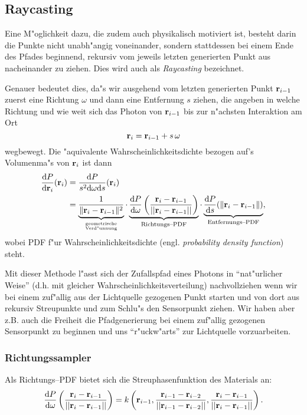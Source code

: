 	\subsection{Raycasting}
	Eine M"oglichkeit dazu, die zudem auch physikalisch motiviert ist, besteht darin die Punkte nicht unabh"angig voneinander, sondern stattdessen bei einem Ende des Pfades beginnend, rekursiv vom jeweils letzten generierten Punkt aus nacheinander zu ziehen. Dies wird auch als {\em Raycasting} bezeichnet.
	
	Genauer bedeutet dies, da"s wir ausgehend vom letzten generierten Punkt $\mathbf{r}_{i-1}$ zuerst eine Richtung $\omega$ und dann eine Entfernung $s$ ziehen, die angeben in welche Richtung und wie weit sich das Photon von $\mathbf{r}_{i-1}$ bis zur n"achsten Interaktion am Ort
	$$\mathbf{r}_i=\mathbf{r}_{i-1}+s\,\omega$$
	wegbewegt.
	Die "aquivalente Wahrscheinlichkeitsdichte bezogen auf's Volumenma"s von $\mathbf{r}_i$ ist dann
	\begin{align*}
		\frac{\text{d}P}{\text{d}\mathbf{r}_i}(\mathbf{r}_i) &= \frac{\text{d}P}{s^2 \text{d}\omega\text{d}s}(\mathbf{r}_i) \\
		&= \underbrace{\frac{1}{\|\mathbf{r}_i - \mathbf{r}_{i-1}\|^2}}_{\text{geometrische}\atop\text{Verd"unnung}} \cdot\underbrace{\frac{\text{d}P}{\text{d}\omega}\left(\frac{\mathbf{r}_i - \mathbf{r}_{i-1}}{||\mathbf{r}_i - \mathbf{r}_{i-1}||}\right)}_{\text{Richtungs--PDF}} \cdot \underbrace{\frac{\text{d}P}{\text{d}s}(\|\mathbf{r}_i-\mathbf{r}_{i-1}\|)}_{\text{Entfernungs--PDF}},
	\end{align*}
	wobei PDF f"ur Wahrscheinlichkeitsdichte (engl. {\em probability density function}) steht.
	
	Mit dieser Methode l"asst sich der Zufallspfad eines Photons in ``nat"urlicher Weise'' (d.h. mit gleicher Wahrscheinlichkeitsverteilung) nachvollziehen wenn wir bei einem zuf"allig aus der Lichtquelle gezogenen Punkt starten und von dort aus rekursiv Streupunkte und zum Schlu"s den Sensorpunkt ziehen. Wir haben aber z.B. auch die Freiheit die Pfadgenerierung bei einem zuf"allig gezogenen Sensorpunkt zu beginnen und uns ``r"uckw"arts'' zur Lichtquelle vorzuarbeiten.
	
	\subsubsection{Richtungssampler}
	Als Richtungs--PDF bietet sich die Streuphasenfunktion des Materials an:
	\begin{equation*}
		\frac{\text{d}P}{\text{d}\omega}\left(\frac{\mathbf{r}_i - \mathbf{r}_{i-1}}{||\mathbf{r}_i - \mathbf{r}_{i-1}||}\right) = k\left(\mathbf{r}_{i-1},\frac{\mathbf{r}_{i-1} - \mathbf{r}_{i-2}}{||\mathbf{r}_{i-1} - \mathbf{r}_{i-2}||},\frac{\mathbf{r}_i - \mathbf{r}_{i-1}}{||\mathbf{r}_i - \mathbf{r}_{i-1}||}\right).
		\label{eq:direction_pdf}
	\end{equation*}
	
